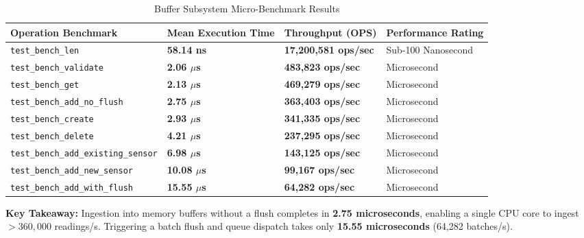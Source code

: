 \documentclass[10pt,a4paper]{report}
\begin{document}
\begin{table}[htbp]
\centering
\small
\caption{Buffer Subsystem Micro-Benchmark Results}
\label{tab:benchmarks}
\begin{tabularx}{\textwidth}{lXXl}
\toprule
\textbf{Operation Benchmark} & \textbf{Mean Execution Time} & \textbf{Throughput (OPS)} & \textbf{Performance Rating} \\
\midrule
\texttt{test\_bench\_len} & \textbf{58.14 ns} & \textbf{17,200,581 ops/sec} & Sub-100 Nanosecond \\
\texttt{test\_bench\_validate} & \textbf{2.06 $\mu$s} & \textbf{483,823 ops/sec} & Microsecond \\
\texttt{test\_bench\_get} & \textbf{2.13 $\mu$s} & \textbf{469,279 ops/sec} & Microsecond \\
\texttt{test\_bench\_add\_no\_flush} & \textbf{2.75 $\mu$s} & \textbf{363,403 ops/sec} & Microsecond \\
\texttt{test\_bench\_create} & \textbf{2.93 $\mu$s} & \textbf{341,335 ops/sec} & Microsecond \\
\texttt{test\_bench\_delete} & \textbf{4.21 $\mu$s} & \textbf{237,295 ops/sec} & Microsecond \\
\texttt{test\_bench\_add\_existing\_sensor} & \textbf{6.98 $\mu$s} & \textbf{143,125 ops/sec} & Microsecond \\
\texttt{test\_bench\_add\_new\_sensor} & \textbf{10.08 $\mu$s} & \textbf{99,167 ops/sec} & Microsecond \\
\texttt{test\_bench\_add\_with\_flush} & \textbf{15.55 $\mu$s} & \textbf{64,282 ops/sec} & Microsecond \\
\bottomrule
\end{tabularx}
\end{table}

\textbf{Key Takeaway:} Ingestion into memory buffers without a flush completes in \textbf{2.75 microseconds}, enabling a single CPU core to ingest $>360,000$ readings/s. Triggering a batch flush and queue dispatch takes only \textbf{15.55 microseconds} (64,282 batches/s).
\end{document}
